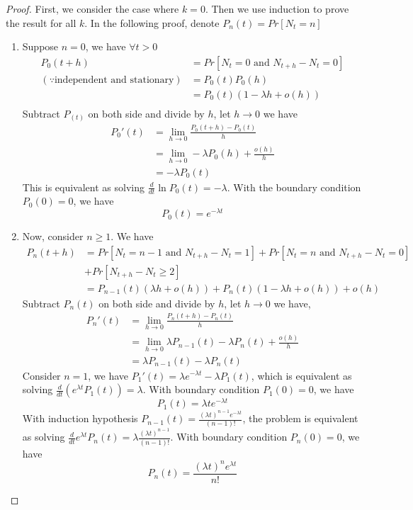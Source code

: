 \documentclass[11pt]{article}
\begin{document}
\begin{proof}
	First, we consider the case where $k=0$. Then we use induction to prove the result for all $k$. In the following proof, denote $P_n(t) = Pr[N_t=n]$
	\begin{enumerate}
		\item Suppose $n=0$, we have $\forall t>0$
		\begin{align*}
		P_0(t+h) &= Pr[N_t=0\mbox{ and }N_{t+h}-N_t=0]\\
		(\because\mbox{independent and stationary})&= P_0(t)P_0(h)\\
		&=P_0(t)(1-\lambda h+o(h))\\
	\end{align*}
	Subtract $P_(t)$ on both side and divide by $h$, let $h\rightarrow0$ we have 
	\begin{align*}
		P_0'(t) &= \lim_{h\rightarrow0}\frac{P_0(t+h)-P_0(t)}{h}\\
		&=\lim_{h\rightarrow0}-\lambda P_0(h) + \frac{o(h)}{h}\\
		&=-\lambda P_0(t)
	\end{align*}
	This is equivalent as solving $\frac{d}{dt}\ln P_0(t) = -\lambda$. With the boundary condition $P_0(0)=0$, we have
	$$P_0(t) = e^{-\lambda t}$$
	\item Now, consider $n\geq1$. We have
	\begin{align*}
	P_n(t+h)&=Pr[N_t = n-1\mbox{ and }N_{t+h}-N_t=1] + Pr[N_t=n\mbox{ and }N_{t+h}-N_t=0]\\
	& + Pr[N_{t+h}-N_t\geq2]\\
	&=P_{n-1}(t)(\lambda h+o(h)) + P_n(t)(1-\lambda h+o(h)) + o(h)
	\end{align*}
	Subtract $P_n(t)$ on both side and divide by $h$, let $h\rightarrow0$ we have,
	\begin{align*}
	P_n'(t) &= \lim_{h\rightarrow0}\frac{P_n(t+h)-P_n(t)}{h}\\
	&=\lim_{h\rightarrow0}\lambda P_{n-1}(t)-\lambda P_n(t) + \frac{o(h)}{h}\\
	&=\lambda P_{n-1}(t)-\lambda P_n(t)
	\end{align*}
	Consider $n=1$, we have $P_1'(t) = \lambda e^{-\lambda t} - \lambda P_1(t)$, which is equivalent as solving $\frac{d}{dt}(e^{\lambda t}P_1(t)) = \lambda$. With boundary condition $P_1(0)=0$, we have
	$$P_1(t) = \lambda te^{-\lambda t}$$
	With induction hypothesis $P_{n-1}(t) = \frac{(\lambda t)^{n-1}e^{-\lambda t}}{(n-1)!}$, the problem is  equivalent as solving $\frac{d}{dt}e^{\lambda t}P_n(t) = \lambda\frac{(\lambda t)^{n-1}}{(n-1)!}$. With boundary condition $P_n(0)=0$, we have
	$$P_n(t) = \frac{(\lambda t)^ne^{\lambda t}}{n!}$$
	\end{enumerate}
\end{proof}
\end{document}
